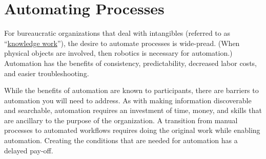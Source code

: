 \section{Automating Processes\label{sec:automating-processes}}




For bureaucratic organizations that deal with intangibles (referred to as ``\href{https://en.wikipedia.org/wiki/Knowledge_worker}{knowledge work}''), the desire to automate processes is wide-pread.  (When physical objects are involved, then robotics is necessary for automation.) Automation has the benefits of consistency, predictability, decreased labor costs, and easier troubleshooting. 

While the benefits of automation are known to participants, there are barriers to automation you will need to address.  
As with making information discoverable and searchable, automation requires an investment of time, money, and skills that are ancillary to the purpose of the organization. A transition from manual processes to automated workflows requires doing the original work while enabling automation. Creating the conditions that are needed for automation has a delayed pay-off. 


